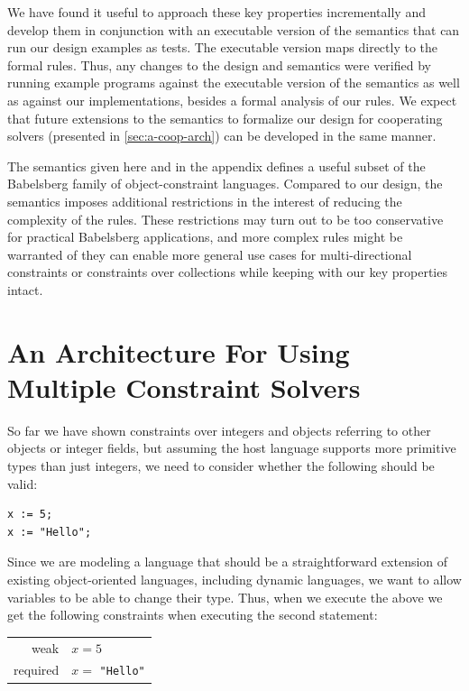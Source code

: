We have found it useful to approach these key properties incrementally and
develop them in conjunction with an executable version of the semantics that can
run our design examples as tests. The executable version maps directly to the
formal rules. Thus, any changes to the design and semantics were verified by
running example programs against the executable version of the semantics as well
as against our implementations, besides a formal analysis of our rules. We
expect that future extensions to the semantics to formalize our design for
cooperating solvers (presented in \autoref{sec:a-coop-arch}) can be developed in
the same manner.

The semantics given here and in the appendix defines a useful subset of the
Babelsberg family of object-constraint languages. Compared to our design, the
semantics imposes additional restrictions in the interest of reducing the
complexity of the rules. These restrictions may turn out to be too conservative
for practical Babelsberg applications, and more complex rules might be warranted
of they can enable more general use cases for multi-directional constraints or
constraints over collections while keeping with our key properties intact.

\chapter{An Architecture For Using Multiple Constraint Solvers}
\label{sec:a-coop-arch}

So far we have shown constraints over integers and objects referring
to other objects or integer fields, but assuming the host language
supports more primitive types than just integers, we need to consider
whether the following should be valid:
\begin{lstlisting}
x := 5;
x := "Hello";
\end{lstlisting}

Since we are modeling a language that should be a straightforward
extension of existing object-oriented languages, including dynamic
languages, we want to allow variables to be able to change their
type. Thus, when we execute the above we get the following constraints
when executing the second statement:
\begin{center}
\begin{tabular}{rl}
weak     & $x = 5$ \\
required & $x = $ \verb|"Hello"|
\end{tabular}
\end{center}

